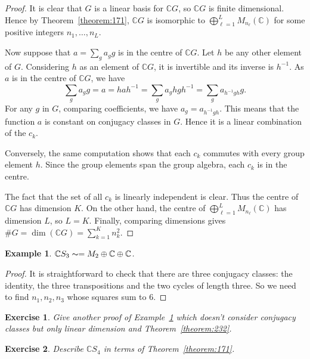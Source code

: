 \documentclass{book}
\newtheorem{exercise}{Exercise}[section]
\newtheorem{example}[definition]{Example}
\begin{document}
\begin{proof}
  It is clear that \(G\) is a linear basis for \(\mathbb{C}G\), so \(\mathbb{C}G\) is finite dimensional.
  Hence by Theorem~\ref{theorem:171}, \(\mathbb{C}G\) is isomorphic to \(\bigoplus^L_{\ell=1}M_{n_\ell}(\mathbb{C})\) for some positive
  integers \(n_1,\ldots,n_L\).\par
  Now suppose that \(a = \sum_g a_g g\) is in the centre of \(\mathbb{C}G\). Let \(h\) be any other
  element of \(G\). Considering \(h\) as an element of \(\mathbb{C}G\), it is invertible and its
  inverse is \(h^{-1}\). As \(a\) is in the centre of \(\mathbb{C}G\), we have
  \[
  \sum_g a_g g = a = hah^{-1} = \sum_g a_g hg h^{-1} = \sum_g a_{h^{-1}g h} g.
  \]
  For any \(g\) in \(G\), comparing coefficients, we have \(a_g = a_{h^{-1}gh}\). This means
  that the function \(a\) is constant on conjugacy classes in \(G\). Hence it is a linear
  combination of the \(c_k\).\par
  Conversely, the same computation shows that each \(c_k\) commutes with
  every group element \(h\). Since the group elements span the group algebra,
  each \(c_k\) is in the centre.\par
  The fact that the set of all \(c_k\) is linearly independent is clear. Thus the centre of \(\mathbb{C}G\) has
  dimension \(K\). On the other hand, the centre of \(\bigoplus^L_{\ell=1}M_{n_\ell}(\mathbb{C})\) has dimension \(L\),
  so \(L=K\). Finally, comparing dimensions gives \(\#G=\dim(\mathbb{C}G)=\sum_{k=1}^K n_k^2\).
\end{proof}
\begin{example}\label{example:233}
  \(\mathbb{C}S_3 \thicksim = M_2 \oplus\mathbb{C}\oplus\mathbb{C}\).
\end{example}
\begin{proof}
  It is straightforward to check that there are three conjugacy classes: the
  identity, the three transpositions and the two cycles of length three. So we
  need to find \(n_1,n_2,n_3\) whose squares sum to \(6\).
\end{proof}
\begin{exercise}
  Give another proof of Example~\ref{example:233} which doesn't consider
  conjugacy classes but only linear dimension and Theorem~\ref{theorem:232}.
\end{exercise}
\begin{exercise}
  Describe \(\mathbb{C}S_4\) in terms of Theorem~\ref{theorem:171}.
\end{exercise}
\end{document}
